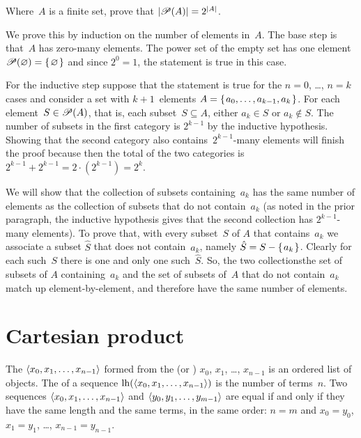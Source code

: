 \documentclass{test}  %
\begin{document}
\begin{ex}
Where~$A$ is a finite set, prove that $|\mathscr{P}(A)|=2^{|A|}$.    
\begin{ans}
We prove this by induction on the number of elements in~$A$.
The base step is that~$A$ has zero-many elements.
The power set of the empty set has
one element $\mathscr{P}(\varnothing)=\mbox{$\{\hspace{0.1em}\varnothing\hspace{0.1em}\}$}$ and
since $2^0=1$, the statement is true in this case. 

For the inductive step suppose that the statement is true for the 
$n=0$, \ldots, $n=k$ cases and consider a set
with $k+1$~elements
$A=\mbox{$\{\hspace{0.1em}a_0, \ldots, a_{k-1},a_k\hspace{0.1em}\}$}$.
For each element~$S\in\mathscr{P}(A)$, that is, each subset~$S\subseteq A$,
either $a_k\in S$ or $a_k\notin S$.
The number of subsets in the first category is $2^{k-1}$ by the inductive
hypothesis.
Showing that 
the second category also contains~$2^{k-1}$-many elements will finish the proof
because then
the total of the two categories is 
$2^{k-1}+2^{k-1}=2\cdot(2^{k-1})=2^k$.

We will show that the collection of subsets containing~$a_k$
has the same number of elements as the collection of subsets that do not
contain~$a_k$
(as noted in the prior paragraph, the inductive hypothesis gives that
the second collection has $2^{k-1}$-many elements).
To prove that, with every subset~$S$ of $A$ that contains~$a_k$ we associate
a subset $\hat{S}$ that does not contain~$a_k$,
namely $\hat{S}=S-\mbox{$\{\hspace{0.1em}a_k\hspace{0.1em}\}$}$.
Clearly for each such~$S$ there is one and only one such~$\hat{S}$.
So, the two collections\Dash the set of subsets of $A$ containing~$a_k$
and the set of subsets of~$A$ that do not contain~$a_k$\Dash match
up element-by-element, and therefore have the same number of elements.
\end{ans}
\end{ex}





\section{Cartesian product}

\begin{df}
The  $\langle x_0, x_1, \ldots, x_{n-1}\rangle$
formed from the  
(or ) $x_0$, $x_1$, \ldots, $x_{n-1}$ 
is an ordered list of objects.
The  of a sequence $\operatorname*{lh}(\langle x_0, x_1, \ldots, x_{n-1}\rangle)$
is the number of terms~$n$.
Two sequences $\langle x_0, x_1, \ldots, x_{n-1}\rangle$ and
$\langle y_0, y_1, \ldots, y_{m-1}\rangle$ are equal if and only if
they have the same length and
the same terms, in the same order:
$n=m$ and
$x_0=y_0$, $x_1=y_1$, \ldots, $x_{n-1}=y_{n-1}$. 
\end{df}
\end{document}
